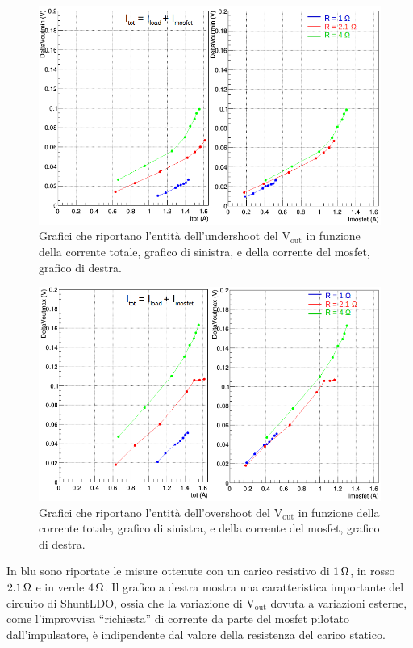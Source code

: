 \begin{figure}
\centering
\includegraphics[width=0.9\linewidth]{Immagini/VoutUnd}
\caption{Grafici che riportano l'entità dell'undershoot del $\mathrm{V_{out}}$ in funzione della corrente totale, grafico di sinistra, e della corrente del mosfet, grafico di destra.}
\label{VoutUnd}
\end{figure}
\begin{figure}
\centering
\includegraphics[width=0.9\linewidth]{Immagini/VoutOver}
\caption{Grafici che riportano l'entità dell'overshoot del $\mathrm{V_{out}}$ in funzione della corrente totale, grafico di sinistra, e della corrente del mosfet, grafico di destra.}
\label{VoutOver}
\end{figure}
In blu sono riportate le misure ottenute con un carico resistivo di $1 {\rm \, \Omega}$, in rosso $2.1 {\rm \, \Omega}$  e in verde $4 {\rm \, \Omega}$.
Il grafico a destra mostra una caratteristica importante del circuito di ShuntLDO, ossia che la variazione di $\mathrm{V_{out}}$ dovuta a variazioni esterne, come l'improvvisa ``richiesta'' di corrente da parte del mosfet pilotato dall'impulsatore, è indipendente dal valore della resistenza del carico statico.
